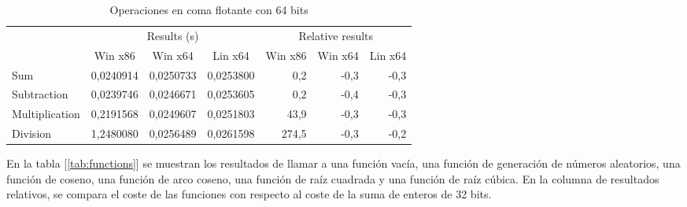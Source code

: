 \begin{table}[h]
\centering
\begin{tabular}{@{}l|rrr|rrr|@{}}
\cmidrule(l){2-7}
                                     & \multicolumn{3}{c|}{Results (s)}                                                               & \multicolumn{3}{c|}{Relative results}                                                      \\ \cmidrule(l){2-7} 
                                     & \multicolumn{1}{c|}{Win x86} & \multicolumn{1}{c|}{Win x64} & \multicolumn{1}{c|}{Lin x64} & \multicolumn{1}{c|}{Win x86} & \multicolumn{1}{c|}{Win x64} & \multicolumn{1}{c|}{Lin x64} \\ \midrule
\multicolumn{1}{|l|}{Sum}            & 0,0240914                    & 0,0250733                    & 0,0253800                    & 0,2                          & -0,3                         & -0,3                         \\ \cmidrule(r){1-1}
\multicolumn{1}{|l|}{Subtraction}    & 0,0239746                    & 0,0246671                    & 0,0253605                    & 0,2                          & -0,4                         & -0,3                         \\ \cmidrule(r){1-1}
\multicolumn{1}{|l|}{Multiplication} & 0,2191568                    & 0,0249607                    & 0,0251803                    & 43,9                         & -0,3                         & -0,3                         \\ \cmidrule(r){1-1}
\multicolumn{1}{|l|}{Division}       & 1,2480080                    & 0,0256489                    & 0,0261598                    & 274,5                        & -0,3                         & -0,2                         \\ \bottomrule
\end{tabular}
\caption{Operaciones en coma flotante con 64 bits}
\label{tab:float64}
\end{table}

En la tabla [\ref{tab:functions}] se muestran los resultados de llamar a una función vacía, una función de generación de números aleatorios, una función de coseno, una función de arco coseno, una función de raíz cuadrada y una función de raíz cúbica. En la columna de resultados relativos, se compara el coste de las funciones con respecto al coste de la suma de enteros de 32 bits.\\

